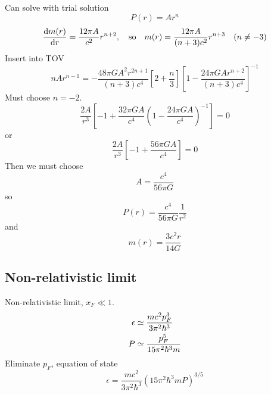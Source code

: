 Can solve with trial solution
\begin{equation}
	P(r) = A r^n
\end{equation}
\begin{equation}
	\odv{m(r)}{r} = \frac{12 \pi A}{c^2} r^{n+2},
	\quad \text{so} \quad
	m(r) = \frac{12 \pi A}{(n+3) c^2} r^{n+3}
	\quad (n \neq -3)
\end{equation}
Insert into TOV
\begin{equation}
	n A r^{n-1} =
	-\frac{48 \pi G A^2 r^{2n+1}}{(n+3) c^4} \left[ 2 + \frac{n}{3} \right] \left[ 1 - \frac{24 \pi G A r^{n+2}}{(n+3) c^4} \right]^{-1}
\end{equation}
Must choose $n = -2$.
\begin{equation}
	\frac{2 A}{r^3} \left[ -1 + \frac{32 \pi G A}{c^4} \left( 1 - \frac{24 \pi G A}{c^4} \right)^{-1} \right] = 0
\end{equation}
or
\begin{equation}
	\frac{2 A}{r^3} \left[ -1 + \frac{56 \pi G A}{c^4} \right] = 0
\end{equation}
Then we must choose
\begin{equation}
	A = \frac{c^4}{56 \pi G}
\end{equation}
so
\begin{equation}
	P(r) = \frac{c^4}{56 \pi G} \frac{1}{r^2}
\end{equation}
and
\begin{equation}
	m(r) = \frac{3 c^2 r}{14 G}
\end{equation}

\subsection{Non-relativistic limit}

Non-relativistic limit, $x_F \ll 1$.
\begin{equation}
\begin{split}
	\epsilon &\simeq \frac{m c^2 p_F^3}{3 \pi^2 \hbar^3} \\
	P        &\simeq \frac{p_F^5}{15 \pi^2 \hbar^3 m}
\end{split}
\end{equation}
Eliminate $p_F$, equation of state
\begin{equation}
	\epsilon = \frac{mc^2}{3\pi^2\hbar^3} \left( 15 \pi^2 \hbar^3 m P \right)^{3/5}
\end{equation}

